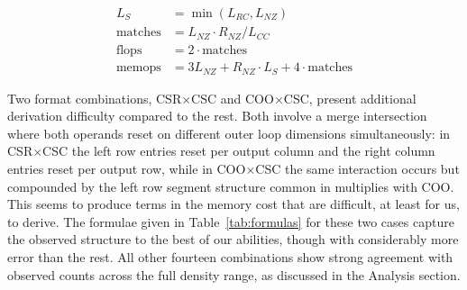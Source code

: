 \documentclass[sigconf, review, anonymous]{acmart}
\begin{document}
\begin{align}
L_S &= \min(L_{RC}, L_{NZ}) \\
\text{matches} &= L_{NZ} \cdot R_{NZ} / L_{CC} \\
\text{flops}  &= 2 \cdot \text{matches} \\
\text{memops} &= 3L_{NZ} + R_{NZ} \cdot L_S + 4 \cdot \text{matches}
\end{align}

Two format combinations, CSR$\times$CSC and COO$\times$CSC, present additional derivation
difficulty compared to the rest. Both involve a merge intersection where both operands
reset on different outer loop dimensions simultaneously: in CSR$\times$CSC the left row entries
reset per output column and the right column entries reset per output row, while in
COO$\times$CSC the same interaction occurs but compounded by the left row segment
structure common in multiplies with COO. This seems to produce terms in the memory
cost that are difficult, at least for us, to derive. The formulae given in
Table~\ref{tab:formulas} for these two cases capture the observed structure to the best
of our abilities, though with considerably more error than the rest. All other
fourteen combinations show strong agreement with observed counts across the full density range,
as discussed in the Analysis section.
\end{document}
